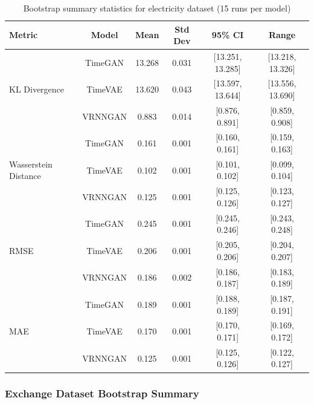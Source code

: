 \documentclass[11pt]{article}
\begin{document}
\begin{table}[H]
\centering
\caption{Bootstrap summary statistics for electricity dataset (15 runs per model)}
\label{tab:bootstrap_electricity}
\small
\begin{tabular}{lccccc}
\toprule
\textbf{Metric} & \textbf{Model} & \textbf{Mean} & \textbf{Std Dev} & \textbf{95\% CI} & \textbf{Range} \\
\midrule
\multirow{3}{*}{KL Divergence} 
    & TimeGAN   & 13.268 & 0.031 & [13.251, 13.285] & [13.218, 13.326] \\
    & TimeVAE   & 13.620 & 0.043 & [13.597, 13.644] & [13.556, 13.690] \\
    & VRNNGAN   & 0.883  & 0.014 & [0.876, 0.891]   & [0.859, 0.908] \\
\midrule
\multirow{3}{*}{Wasserstein Distance} 
    & TimeGAN   & 0.161 & 0.001 & [0.160, 0.161] & [0.159, 0.163] \\
    & TimeVAE   & 0.102 & 0.001 & [0.101, 0.102] & [0.099, 0.104] \\
    & VRNNGAN   & 0.125 & 0.001 & [0.125, 0.126] & [0.123, 0.127] \\
\midrule
\multirow{3}{*}{RMSE} 
    & TimeGAN   & 0.245 & 0.001 & [0.245, 0.246] & [0.243, 0.248] \\
    & TimeVAE   & 0.206 & 0.001 & [0.205, 0.206] & [0.204, 0.207] \\
    & VRNNGAN   & 0.186 & 0.002 & [0.186, 0.187] & [0.183, 0.189] \\
\midrule
\multirow{3}{*}{MAE} 
& TimeGAN   & 0.189 & 0.001 & [0.188, 0.189] & [0.187, 0.191] \\
& TimeVAE   & 0.170 & 0.001 & [0.170, 0.171] & [0.169, 0.172] \\
& VRNNGAN   & 0.125 & 0.001 & [0.125, 0.126] & [0.122, 0.127] \\
\bottomrule
\end{tabular}
\end{table}

\newpage
\subsubsection{Exchange Dataset Bootstrap Summary}
\end{document}
